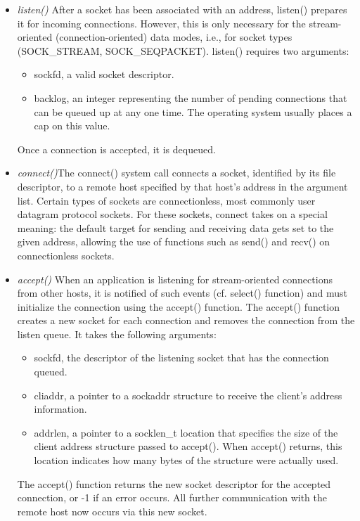 \begin{itemize}
\begin{itemize}
		\end{itemize}
	\item \textit{listen()} After a socket has been associated with an address, listen() prepares it for incoming connections. However, this is only necessary for the stream-oriented (connection-oriented) data modes, i.e., for socket types (SOCK\_STREAM, SOCK\_SEQPACKET). listen() requires two arguments:
		\begin{itemize}
			\item sockfd, a valid socket descriptor.
			\item backlog, an integer representing the number of pending connections that can be queued up at any one time. The operating system usually places a cap on this value.
		\end{itemize}
	Once a connection is accepted, it is dequeued.
	\item \textit{connect()}The connect() system call connects a socket, identified by its file descriptor, to a remote host specified by that host's address in the argument list.
Certain types of sockets are connectionless, most commonly user datagram protocol sockets. For these sockets, connect takes on a special meaning: the default target for sending and receiving data gets set to the given address, allowing the use of functions such as send() and recv() on connectionless sockets.
	\item \textit{accept()} When an application is listening for stream-oriented connections from other hosts, it is notified of such events (cf. select() function) and must initialize the connection using the accept() function. The accept() function creates a new socket for each connection and removes the connection from the listen queue. It takes the following arguments:
		\begin{itemize}
			\item sockfd, the descriptor of the listening socket that has the connection queued.
			\item cliaddr, a pointer to a sockaddr structure to receive the client's address information.
			\item addrlen, a pointer to a socklen\_t location that specifies the size of the client address structure passed to accept(). When accept() returns, this location indicates how many bytes of the structure were actually used.
		\end{itemize}
The accept() function returns the new socket descriptor for the accepted connection, or -1 if an error occurs. All further communication with the remote host now occurs via this new socket.

\end{itemize}
